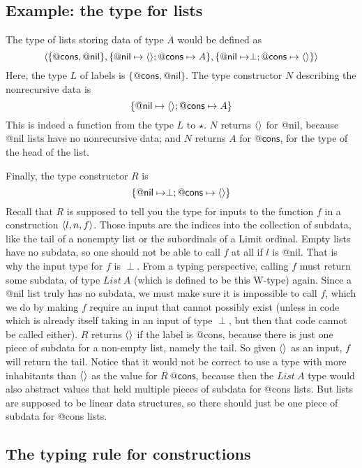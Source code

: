 \documentclass{article}
\begin{document}
\subsection{Example: the type for lists}

\noindent The type of lists storing data of type $A$ would be defined as
\[
\langle \{\mathsf{@cons},\mathsf{@nil}\} , \{\mathsf{@nil} \mapsto \langle\rangle ; \mathsf{@cons} \mapsto A\} , \{\mathsf{@nil} \mapsto \perp ; \mathsf{@cons} \mapsto \langle\rangle\} \rangle
\]
\noindent Here, the type $L$ of labels is $\{\mathsf{@cons},\mathsf{@nil}\}$.  The type constructor $N$ describing the
nonrecursive data is
\[
\{\mathsf{@nil} \mapsto \langle\rangle ; \mathsf{@cons} \mapsto A\}
\]
\noindent This is indeed a function from the type $L$ to $\star$.  $N$
returns $\langle\rangle$ for \textsf{@nil}, because \textsf{@nil} lists have
no nonrecursive data; and $N$ returns $A$ for $\textsf{@cons}$, for the
type of the head of the list.

Finally, the type constructor $R$ is 
\[
\{\mathsf{@nil} \mapsto \perp ; \mathsf{@cons} \mapsto \langle\rangle\}
\]
\noindent Recall that $R$ is supposed to tell you the type for inputs
to the function $f$ in a construction $\langle l , n, f \rangle$.  Those inputs
are the indices into the collection of subdata, like the tail of a
nonempty list or the subordinals of a Limit ordinal. Empty lists have
no subdata, so one should not be able to call $f$ at all if $l$ is
\textsf{@nil}.  That is why the input type for $f$ is $\perp$.  From a
typing perspective, calling $f$ must return some subdata, of type
$\textit{List}\ A$ (which is defined to be this W-type) again.  Since
a \textsf{@nil} list truly has no subdata, we must make sure it is
impossible to call $f$, which we do by making $f$ require an input
that cannot possibly exist (unless in code which is already itself
taking in an input of type $\perp$, but then that code cannot be
called either).  $R$ returns $\langle\rangle$ if the label is \textsf{@cons},
because there is just one piece of subdata for a non-empty list,
namely the tail.  So given $\langle\rangle$ as an input, $f$ will return the
tail.  Notice that it would not be correct to use a type with more
inhabitants than $\langle\rangle$ as the value for $R\ \mathsf{@cons}$,
because then the $\textit{List}\ A$ type would also abstract values
that held multiple pieces of subdata for \textsf{@cons} lists.  But
lists are supposed to be linear data structures, so there should just
be one piece of subdata for \textsf{@cons} lists.

\subsection{The typing rule for constructions}
\end{document}
